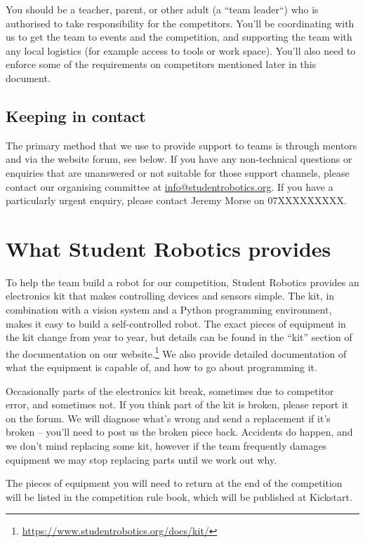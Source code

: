 \documentclass[a4paper]{article}
\begin{document}
You should be a teacher, parent, or other adult (a ``team leader``) who is
authorised to take responsibility for the competitors. You'll be coordinating
with us to get the team to events and the competition, and supporting the
team with any local logistics (for example access to tools or work space).
You'll also need to enforce some of the requirements on competitors mentioned
later in this document.

\subsection*{Keeping in contact}

The primary method that we use to provide support to teams is through mentors
and via the website forum, see below. If you have any non-technical questions
or enquiries that are unanswered or not suitable for those support channels,
please contact our organising committee at \url{info@studentrobotics.org}. If
you have a particularly urgent enquiry, please contact Jeremy Morse on
07XXXXXXXXX.

\section*{What Student Robotics provides}

To help the team build a robot for our competition, Student Robotics provides
an electronics kit that makes controlling devices and sensors simple. The kit,
in combination with a vision system and a Python programming environment,
makes it easy to build a self-controlled robot. The exact pieces of equipment
in the kit change from year to year, but details can be found in the ``kit''
section of the documentation on our
website.\footnote{\url{https://www.studentrobotics.org/docs/kit/}}
We also provide detailed documentation of what the equipment is capable of,
and how to go about programming it.

Occasionally parts of the electronics kit break, sometimes due to competitor
error, and sometimes not. If you think part of the kit is broken,
please report it on the forum. We will diagnose what's wrong and
send a replacement if it's broken -- you'll need to post us the broken piece
back. Accidents do happen, and we don't mind replacing some kit, however if
the team frequently damages equipment we may stop replacing parts until we
work out why.

The pieces of equipment you will need to return at the end of the competition
will be listed in the competition rule book, which will be published at Kickstart.
\end{document}

